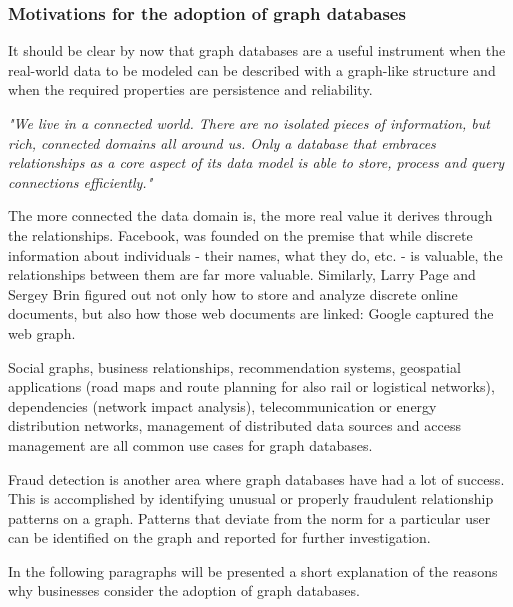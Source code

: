 \subsubsection{Motivations for the adoption of graph databases} \label{subsubsection:LiteratureReview/ReviewofGraphDatabaseSystems/Graphdatabasecharacteristics/Motivationsfortheadoptionofgraphdatabases}
It should be clear by now that graph databases are a useful instrument when the real-world data to be modeled can be described with a graph-like structure and when the required properties are persistence and reliability.

\begin{quoting}[
	begintext={},
	endtext={ - Neo4j's introduction line}
]
	\textit{
		"We live in a connected world.
		There are no isolated pieces of information, but rich, connected domains all around us.
		Only a database that embraces relationships as a core aspect of its data model is able to store, process and query connections efficiently."
	}
\end{quoting}

The more connected the data domain is, the more real value it derives through the relationships.
\gls{Facebook}, was founded on the premise that while discrete information about individuals - their names, what they do, etc. - is valuable, the relationships between them are far more valuable.
Similarly, Larry Page and Sergey Brin figured out not only how to store and analyze discrete online documents, but also how those web documents are linked:
\gls{Google} captured the web graph.

Social graphs, business relationships, recommendation systems, geospatial applications (road maps and route planning for also rail or logistical networks), dependencies (network impact analysis), telecommunication or energy distribution networks, management of distributed data sources and access management are all common use cases for graph databases.

Fraud detection is another area where graph databases have had a lot of success.
This is accomplished by identifying unusual or properly fraudulent relationship patterns on a graph.
Patterns that deviate from the norm for a particular user can be identified on the graph and reported for further investigation.

In the following paragraphs will be presented a short explanation of the reasons why businesses consider the adoption of graph databases.

